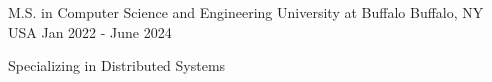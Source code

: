 

\begin{cventries}


  \cventry
    {M.S. in Computer Science and Engineering} %
    {University at Buffalo} %
    {Buffalo, NY USA} %
    {Jan 2022 - June 2024} %
    {
      \begin{cvitems} %
        \item {Specializing in Distributed Systems}
      \end{cvitems}
    }



\end{cventries}
